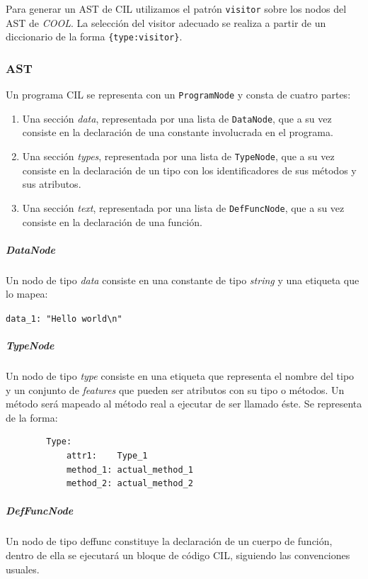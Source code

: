 \documentclass[a4paper,10pt,twocolumn]{article}
\begin{document}
Para generar un AST de CIL utilizamos el patrón \lstinline|visitor| sobre los nodos del AST de \textit{COOL}. La selección del visitor adecuado se realiza a partir de un diccionario de la forma \lstinline|{type:visitor}|.

\subsubsection{AST}

Un programa CIL se representa con un \lstinline|ProgramNode| y consta de cuatro partes:

\begin{enumerate}
	\item Una sección \textit{data}, representada por una lista de \lstinline|DataNode|, que a su vez consiste en la declaración de una constante involucrada en el programa. 
	\item Una sección \textit{types}, representada por una lista de \lstinline|TypeNode|, que a su vez consiste en la declaración de un tipo con los identificadores de sus métodos y sus atributos. 
	\item Una sección \textit{text}, representada por una lista de \lstinline|DefFuncNode|, que a su vez consiste en la declaración de una función.
\end{enumerate}

\subparagraph{DataNode}

Un nodo de tipo \textit{data} consiste en una constante de tipo \textit{string} y una etiqueta que lo mapea:

\begin{center}
	\lstinline|data_1: "Hello world\n"|
\end{center}

\subparagraph{TypeNode}

Un nodo de tipo \textit{type} consiste en una etiqueta que representa el nombre del tipo y un conjunto de \textit{features} que pueden ser atributos con su tipo o métodos. Un método será mapeado al método real a ejecutar de ser llamado éste. Se representa de la forma:

\begin{center}
	\begin{lstlisting}
		Type:
			attr1: 	  Type_1
			method_1: actual_method_1
			method_2: actual_method_2
	\end{lstlisting}
\end{center}

\subparagraph{DefFuncNode}
Un nodo de tipo {deffunc} constituye la declaración de un cuerpo de función, dentro de ella se ejecutará un bloque de código CIL, siguiendo las convenciones usuales. 
\end{document}
